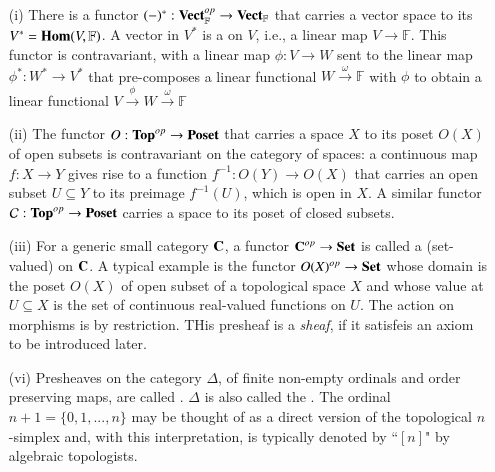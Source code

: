 \documentclass[12pt, a4paper, oneside, openright, titlepage]{book}
\begin{document}
\begin{eg}
    \leavevmode
    \begin{enumerate}
        \item[(i)] There is a functor $(-)^*:\normalfont\textbf{Vect}^{op}_{\mathbb{F}}\rightarrow \normalfont\textbf{Vect}_{\mathbb{F}}$ that carries a vector space to its  $V^* = \normalfont\textbf{Hom}(V,\mathbb{F})$. A vector in $V^*$ is a  on $V$, i.e., a linear map $V\rightarrow \mathbb{F}$. This functor is contravariant, with a linear map $\phi:V\rightarrow W$ sent to the linear map $\phi^*:W^*\rightarrow V^*$ that pre-composes a linear functional $W\xrightarrow{\omega}\mathbb{F}$ with $\phi$ to obtain a linear functional $V\xrightarrow{\phi}W\xrightarrow{\omega}\mathbb{F}$
        \item[(ii)] The functor $O:\normalfont\textbf{Top}^{op}\rightarrow \normalfont\textbf{Poset}$ that carries a space $X$ to its poset $O(X)$ of open subsets is contravariant on the category of spaces: a continuous map $f:X\rightarrow Y$ gives rise to a function $f^{-1}:O(Y)\rightarrow O(X)$ that carries an open subset $U \subseteq Y$ to its preimage $f^{-1}(U)$, which is open in $X$. A similar functor $\mathcal{C}:\normalfont\textbf{Top}^{op}\rightarrow \normalfont\textbf{Poset}$ carries a space to its poset of closed subsets.
        \item[(iii)] For a generic small category $\normalfont\textbf{C}$, a functor $\normalfont\textbf{C}^{op}\rightarrow \normalfont\textbf{Set}$ is called a (set-valued)  on $\normalfont\textbf{C}$. A typical example is the functor $O(X)^{op}\rightarrow \normalfont\textbf{Set}$ whose domain is the poset $O(X)$ of open subset of a topological space $X$ and whose value at $U \subseteq X$ is the set of continuous real-valued functions on $U$. The action on morphisms is by restriction. THis presheaf is a \emph{sheaf}, if it satisfeis an axiom to be introduced later.
        \item[(vi)] Presheaves on the category $\Delta$, of finite non-empty ordinals and order preserving maps, are called . $\Delta$ is also called the . The ordinal $n+1 = \{0,1,...,n\}$ may be thought of as a direct version of the topological $n$-simplex and, with this interpretation, is typically denoted by ``$[n]$" by algebraic topologists.
    \end{enumerate}
\end{eg}
\end{document}
